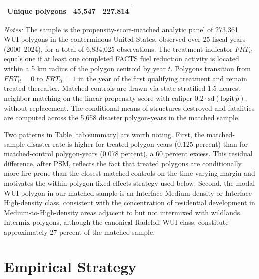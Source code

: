 \documentclass[12pt, letterpaper]{article}
\begin{document}
\begin{table}[H]
\begin{threeparttable}
\begin{tabular}{lcccc}
Unique polygons & \multicolumn{2}{c}{45{,}547} & \multicolumn{2}{c}{227{,}814} \\
\bottomrule
\end{tabular}
\begin{tablenotes}
\small
\item \textit{Notes:} The sample is the propensity-score-matched analytic panel of 273{,}361 WUI polygons in the conterminous United States, observed over 25 fiscal years (2000--2024), for a total of 6{,}834{,}025 observations. The treatment indicator $FRT_{it}$ equals one if at least one completed FACTS fuel reduction activity is located within a 5 km radius of the polygon centroid by year $t$. Polygons transition from $FRT_{it} = 0$ to $FRT_{it} = 1$ in the year of the first qualifying treatment and remain treated thereafter. Matched controls are drawn via state-stratified 1:5 nearest-neighbor matching on the linear propensity score with caliper $0.2 \cdot \mathrm{sd}(\mathrm{logit}\,\hat p)$, without replacement. The conditional means of structures destroyed and fatalities are computed across the 5{,}658 disaster polygon-years in the matched sample.
\end{tablenotes}
\end{threeparttable}
\end{table}

Two patterns in Table \ref{tab:summary} are worth noting. First, the matched-sample disaster rate is higher for treated polygon-years (0.125 percent) than for matched-control polygon-years (0.078 percent), a 60 percent excess. This residual difference, after PSM, reflects the fact that treated polygons are conditionally more fire-prone than the closest matched controls on the time-varying margin and motivates the within-polygon fixed effects strategy used below. Second, the modal WUI polygon in our matched sample is an Interface Medium-density or Interface High-density class, consistent with the concentration of residential development in Medium-to-High-density areas adjacent to but not intermixed with wildlands. Intermix polygons, although the canonical Radeloff WUI class, constitute approximately 27 percent of the matched sample.


\section{Empirical Strategy}\label{sec:strategy}
\end{document}
